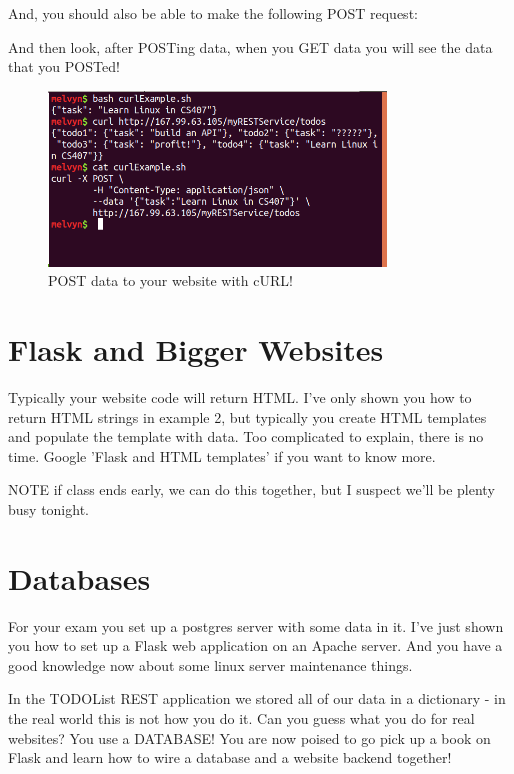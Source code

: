 \documentclass[10pt]{article}
\begin{document}
And, you should also be able to make the following POST request:



And then look, after POSTing data, when you GET data you will see the data that you POSTed!

\begin{figure}[h]
  \centering
    \includegraphics[width=0.8\textwidth]{addedToTODOList.png}
  \caption{POST data to your website with cURL!}
\end{figure}

\pagebreak

\section{Flask and Bigger Websites}
Typically your website code will return HTML. I've only shown you how to return HTML strings in example 2, but typically you create HTML templates and populate the template with data. Too complicated to explain, there is no time. Google 'Flask and HTML templates' if you want to know more.

NOTE if class ends early, we can do this together, but I suspect we'll be plenty busy tonight.

\section{Databases}
For your exam you set up a postgres server with some data in it. I've just shown you how to set up a Flask web application on an Apache server. And you have a good knowledge now about some linux server maintenance things. 

In the TODOList REST application we stored all of our data in a dictionary - in the real world this is not how you do it. Can you guess what you do for real websites? You use a DATABASE! You are now poised to go pick up a book on Flask and learn how to wire a database and a website backend together!
\end{document}
